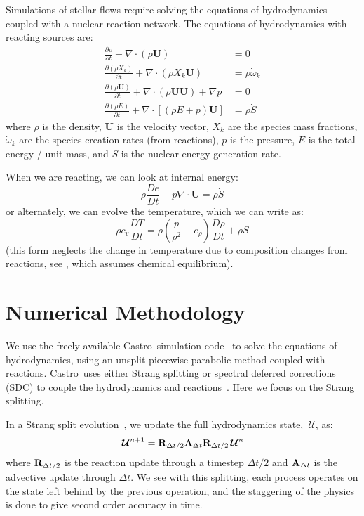 \documentclass[times,preprint]{aastex63}
\newcommand{\castro}{{\sf Castro}}
\newcommand{\Ub}{\mathbf{U}}
\newcommand{\omegadot}{\dot{\omega}}
\newcommand{\Sdot}{\dot{S}}
\newcommand{\Uc}{{\,\bm{\mathcal{U}}}}
\begin{document}
Simulations of stellar flows require solving the equations of
hydrodynamics coupled with a nuclear reaction network.  The equations
of hydrodynamics with reacting sources are:
\begin{align}
\frac{\partial \rho}{\partial t} + \nabla \cdot (\rho \Ub) &= 0 \\
\frac{\partial (\rho X_k)}{\partial t} + \nabla \cdot (\rho X_k \Ub) &= \rho \omegadot_k \\
\frac{\partial (\rho \Ub)}{\partial t} + \nabla \cdot (\rho \Ub \Ub) + \nabla p &= 0 \\
\frac{\partial (\rho E)}{\partial t} + \nabla \cdot \left [ (\rho E + p) \Ub \right ] &= \rho \Sdot
\end{align}
where $\rho$ is the density, $\Ub$ is the velocity vector, $X_k$ are the species mass fractions,
$\omegadot_k$ are the species creation rates (from reactions), $p$ is the pressure, $E$ is the
total energy / unit mass, and $\Sdot$ is the nuclear energy generation rate.

When we are reacting, we can look at internal energy:
\begin{equation}
\rho \frac{De}{Dt} + p \nabla \cdot \Ub = \rho \Sdot
\end{equation}
or alternately, we can evolve the temperature, which we can write as:
\begin{equation}
\rho c_v \frac{DT}{Dt} = \rho \left (\frac{p}{\rho^2} - e_\rho \right ) \frac{D\rho}{Dt} + \rho \Sdot
\end{equation}
(this form neglects the change in temperature due to composition
changes from reactions, see \citealt{ABNZ:III}, which assumes chemical
equilibrium). 


\section{Numerical Methodology}

We use the freely-available \castro\ simulation
code~\citep{castro,castro_joss} to solve the equations of
hydrodynamics, using an unsplit piecewise parabolic method coupled with
reactions.  \castro\ uses either Strang splitting or
spectral deferred corrections (SDC) to couple the hydrodynamics and
reactions~\citep{castro_sdc}.  Here we focus on the Strang splitting.

In a Strang split evolution~\citep{strang:1968}, we update the full
hydrodynamics state, $\Uc$, as:
\begin{equation}
  \Uc^{n+1} = {\bf R}_{\Delta t/2} {\bf A}_{\Delta t} {\bf R}_{\Delta t/2} \Uc^n
\end{equation}
where ${\bf R}_{\Delta t/2}$ is the reaction update through a timestep
$\Delta t/2$ and ${\bf A}_{\Delta t}$ is the advective update through
$\Delta t$.  We see with this splitting, each process operates on the
state left behind by the previous operation, and the staggering of the
physics is done to give second order accuracy in time.
\end{document}
